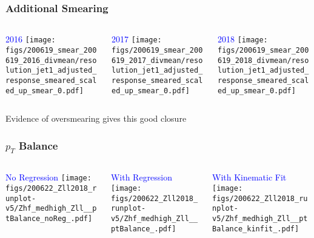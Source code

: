 \documentclass{beamer}
\begin{document}
\begin{frame}
  \frametitle{Additional Smearing}

  \begin{columns}
    \begin{column}{0.33\linewidth}
      \centering
      \textcolor{blue}{2016}
      \texttt{[image: figs/200619\_smear\_200619\_2016\_divmean/resolution\_jet1\_adjusted\_response\_smeared\_scaled\_up\_smear\_0.pdf]}
    \end{column}
    \begin{column}{0.34\linewidth}
      \centering
      \textcolor{blue}{2017}
      \texttt{[image: figs/200619\_smear\_200619\_2017\_divmean/resolution\_jet1\_adjusted\_response\_smeared\_scaled\_up\_smear\_0.pdf]}
    \end{column}
    \begin{column}{0.33\linewidth}
      \centering
      \textcolor{blue}{2018}
      \texttt{[image: figs/200619\_smear\_200619\_2018\_divmean/resolution\_jet1\_adjusted\_response\_smeared\_scaled\_up\_smear\_0.pdf]}
    \end{column}
  \end{columns}

  \vfill
  Evidence of oversmearing gives this good closure

\end{frame}
\begin{frame}
  \frametitle{$p_T$ Balance}

  \begin{columns}
    \begin{column}{0.33\linewidth}
      \centering
      \textcolor{blue}{No Regression}
      \texttt{[image: figs/200622\_Zll2018\_runplot-v5/Zhf\_medhigh\_Zll\_\_ptBalance\_noReg\_.pdf]}
    \end{column}
    \begin{column}{0.34\linewidth}
      \centering
      \textcolor{blue}{With Regression}
      \texttt{[image: figs/200622\_Zll2018\_runplot-v5/Zhf\_medhigh\_Zll\_\_ptBalance\_.pdf]}
    \end{column}
    \begin{column}{0.33\linewidth}
      \centering
      \textcolor{blue}{With Kinematic Fit}
      \texttt{[image: figs/200622\_Zll2018\_runplot-v5/Zhf\_medhigh\_Zll\_\_ptBalance\_kinfit\_.pdf]}
    \end{column}
  \end{columns}

\end{frame}
\end{document}

